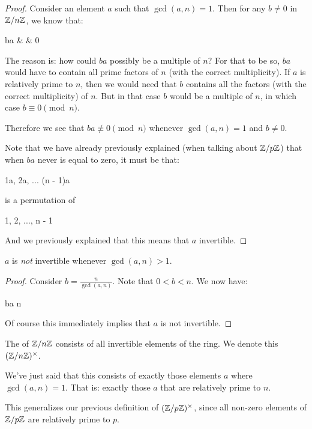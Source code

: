 \begin{proof}
  Consider an element $a$ such that $\gcd(a, n) = 1$. Then for any $b
  \ne 0$ in $\mathbb{Z} / n\mathbb{Z}$, we know that:

    \begin{nedqn}
      ba
    & \not\equiv &
      0 
    \end{nedqn}

  The reason is: how could $ba$ possibly be a multiple of $n$? For that
  to be so, $ba$ would have to contain all prime factors of $n$ (with
  the correct multiplicity). If $a$ is relatively prime to $n$, then we
  would need that $b$ contains all the factors (with the correct
  multiplicity) of $n$. But in that case $b$ would be a multiple of $n$,
  in which case $b \equiv 0 \pmod{n}$.

  Therefore we see that $ba \not\equiv 0 \pmod{n}$ whenever $\gcd(a, n)
  = 1$ and $b \ne 0$.

  Note that we have already previously explained (when talking about
  $\mathbb{Z} / p\mathbb{Z}$) that when $ba$ never is equal to zero, it must be that:

  \begin{nedqn}
    1a, 2a, ... (n - 1)a
  \end{nedqn}

  is a permutation of

  \begin{nedqn}
    1, 2, ..., n - 1
  \end{nedqn}

  And we previously explained that this means that $a$ invertible.
\end{proof}

\begin{lemma}
  $a$ is \emph{not} invertible whenever $\gcd(a, n) > 1$.
\end{lemma}

\begin{proof}
  Consider $b = \frac{n}{\gcd(a, n)}$. Note that $0 < b < n$. We now
  have:

  \begin{nedqn}
    ba
  \equivcol
    n
  \\
   
  \end{nedqn}

  Of course this immediately implies that $a$ is not invertible.
\end{proof}

\begin{definition}
  The  of $\mathbb{Z} / n\mathbb{Z}$ consists of all
  invertible elements of the ring. We denote this $\mathopen{}\left( {\mathbb{Z} / n\mathbb{Z}} \right)\mathclose{}^\times$.

  We've just said that this consists of exactly those elements $a$ where
  $\gcd(a, n) = 1$. That is: exactly those $a$ that are relatively prime
  to $n$.

  This generalizes our previous definition of $\mathopen{}\left( {\mathbb{Z} / p\mathbb{Z}} \right)\mathclose{}^\times$, since all
  non-zero elements of $\mathbb{Z} / p\mathbb{Z}$ are relatively prime to $p$.
\end{definition}
